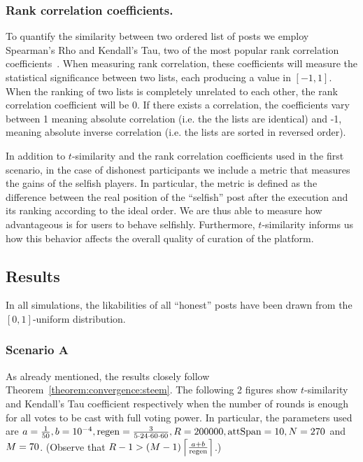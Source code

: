     \subsubsection*{Rank correlation coefficients.}
      To quantify the similarity between two ordered list of posts we employ
      Spearman's Rho and Kendall's Tau, two of the most popular rank correlation
      coefficients~\cite{kendall1955rank}. When measuring rank correlation,
      these coefficients will measure the statistical significance between two
      lists, each producing a value in $\left[-1, 1\right]$. When the ranking of
      two lists is completely unrelated to each other, the rank correlation
      coefficient will be 0. If there exists a correlation, the coefficients
      vary between 1 meaning absolute correlation (i.e. the the lists are
      identical) and -1, meaning absolute inverse correlation (i.e. the lists
      are sorted in reversed order).

    In addition to $t$-similarity and the rank correlation coefficients used in
    the first scenario, in the case of dishonest participants we include a
    metric that measures the gains of the selfish players. In particular, the
    metric is defined as the difference between the real position of the
    ``selfish'' post after the execution and its ranking according to the ideal
    order. We are thus able to measure how advantageous is for users to behave
    selfishly.  Furthermore, $t$-similarity informs us how this behavior
    affects the overall quality of curation of the platform.

  \subsection{Results}
    In all simulations, the likabilities of all ``honest'' posts have been drawn
    from the $\left[0, 1\right]$-uniform distribution.

    \subsubsection*{Scenario A}
      As already mentioned, the results closely follow
      Theorem~\ref{theorem:convergence:steem}. The following 2 figures show
      $t$-similarity and Kendall's Tau coefficient respectively when the number
      of rounds is enough for all votes to be cast with full voting power. In
      particular, the parameters used are $a = \frac{1}{50}, b = 10^{-4}, \regen
      = \frac{3}{5 \cdot 24 \cdot 60 \cdot 60}, \rounds = 200000, \attspan = 10,
      \playerlen = 270$ and $\postlen = 70$. (Observe that $\rounds - 1 >
      \left(\postlen - 1\right)\ceil*{\frac{a + b}{\regen}}$.)

